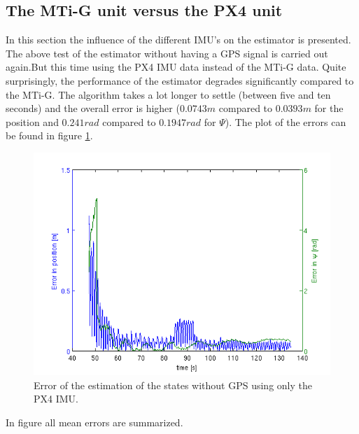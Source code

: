 \subsection{The MTi-G unit versus the PX4 unit}\label{IMU_comp}
In this section the influence of the different IMU's on the estimator is presented. The above test of the estimator without having a GPS signal is carried out again.But this time using the PX4 IMU data instead of the MTi-G data. %
Quite surprisingly, the performance of the estimator degrades significantly compared to the MTi-G. The algorithm takes a lot longer to settle (between five and ten seconds) and the overall error is higher ($0.0743 m$ compared to $0.0393 m$ for the position and $0.241 rad$ compared to $0.1947 rad$ for $\Psi$). The plot of the errors can be found in figure \ref{error_noGPS_P}. 
\begin{figure}[h]
\centering
\includegraphics[width=1\textwidth]{pictures/2_2_P_errors_noGPS.png}
\caption{Error of the estimation of the states without GPS using only the PX4 IMU.}
\label{error_noGPS_P}
\end{figure}
In figure all mean errors are summarized.
